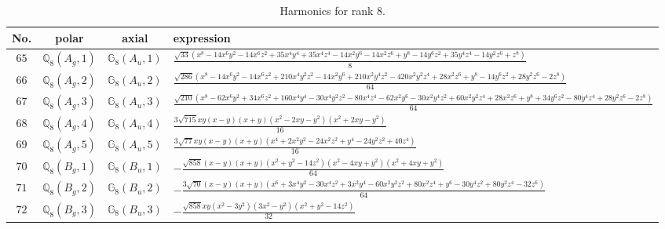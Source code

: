 \documentclass[fleqn,8pt,landscape]{jsarticle}
\begin{document}
\begin{table}[ht!]
\begin{center}
\caption{Harmonics for rank 8.}
\renewcommand{\arraystretch}{1.3}
\begin{tabular}{cccl} \hline \hline
No. & polar & axial & expression \\ \hline
$ 65 $ & $ \mathbb{Q}_{8}(A_{g},1) $ & $ \mathbb{G}_{8}(A_{u},1) $ & $ \frac{\sqrt{33} \left(x^{8} - 14 x^{6} y^{2} - 14 x^{6} z^{2} + 35 x^{4} y^{4} + 35 x^{4} z^{4} - 14 x^{2} y^{6} - 14 x^{2} z^{6} + y^{8} - 14 y^{6} z^{2} + 35 y^{4} z^{4} - 14 y^{2} z^{6} + z^{8}\right)}{8} $ \\
$ 66 $ & $ \mathbb{Q}_{8}(A_{g},2) $ & $ \mathbb{G}_{8}(A_{u},2) $ & $ \frac{\sqrt{286} \left(x^{8} - 14 x^{6} y^{2} - 14 x^{6} z^{2} + 210 x^{4} y^{2} z^{2} - 14 x^{2} y^{6} + 210 x^{2} y^{4} z^{2} - 420 x^{2} y^{2} z^{4} + 28 x^{2} z^{6} + y^{8} - 14 y^{6} z^{2} + 28 y^{2} z^{6} - 2 z^{8}\right)}{64} $ \\
$ 67 $ & $ \mathbb{Q}_{8}(A_{g},3) $ & $ \mathbb{G}_{8}(A_{u},3) $ & $ \frac{\sqrt{210} \left(x^{8} - 62 x^{6} y^{2} + 34 x^{6} z^{2} + 160 x^{4} y^{4} - 30 x^{4} y^{2} z^{2} - 80 x^{4} z^{4} - 62 x^{2} y^{6} - 30 x^{2} y^{4} z^{2} + 60 x^{2} y^{2} z^{4} + 28 x^{2} z^{6} + y^{8} + 34 y^{6} z^{2} - 80 y^{4} z^{4} + 28 y^{2} z^{6} - 2 z^{8}\right)}{64} $ \\
$ 68 $ & $ \mathbb{Q}_{8}(A_{g},4) $ & $ \mathbb{G}_{8}(A_{u},4) $ & $ \frac{3 \sqrt{715} x y \left(x - y\right) \left(x + y\right) \left(x^{2} - 2 x y - y^{2}\right) \left(x^{2} + 2 x y - y^{2}\right)}{16} $ \\
$ 69 $ & $ \mathbb{Q}_{8}(A_{g},5) $ & $ \mathbb{G}_{8}(A_{u},5) $ & $ \frac{3 \sqrt{77} x y \left(x - y\right) \left(x + y\right) \left(x^{4} + 2 x^{2} y^{2} - 24 x^{2} z^{2} + y^{4} - 24 y^{2} z^{2} + 40 z^{4}\right)}{16} $ \\
$ 70 $ & $ \mathbb{Q}_{8}(B_{g},1) $ & $ \mathbb{G}_{8}(B_{u},1) $ & $ - \frac{\sqrt{858} \left(x - y\right) \left(x + y\right) \left(x^{2} + y^{2} - 14 z^{2}\right) \left(x^{2} - 4 x y + y^{2}\right) \left(x^{2} + 4 x y + y^{2}\right)}{64} $ \\
$ 71 $ & $ \mathbb{Q}_{8}(B_{g},2) $ & $ \mathbb{G}_{8}(B_{u},2) $ & $ - \frac{3 \sqrt{70} \left(x - y\right) \left(x + y\right) \left(x^{6} + 3 x^{4} y^{2} - 30 x^{4} z^{2} + 3 x^{2} y^{4} - 60 x^{2} y^{2} z^{2} + 80 x^{2} z^{4} + y^{6} - 30 y^{4} z^{2} + 80 y^{2} z^{4} - 32 z^{6}\right)}{64} $ \\
$ 72 $ & $ \mathbb{Q}_{8}(B_{g},3) $ & $ \mathbb{G}_{8}(B_{u},3) $ & $ - \frac{\sqrt{858} x y \left(x^{2} - 3 y^{2}\right) \left(3 x^{2} - y^{2}\right) \left(x^{2} + y^{2} - 14 z^{2}\right)}{32} $ \\

\end{tabular}
\end{center}
\end{table}
\end{document}

